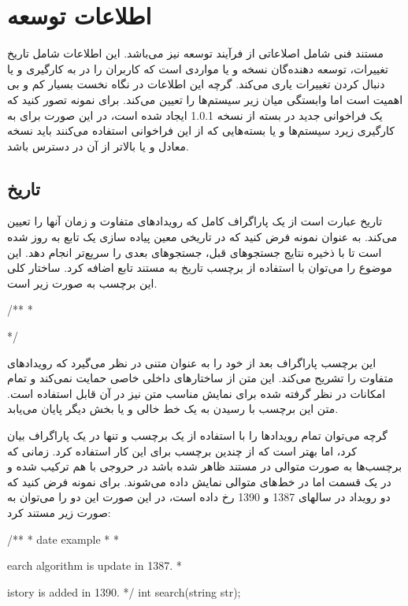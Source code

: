 
\section{اطلاعات توسعه}

مستند فنی شامل اصلاعاتی از فرآیند توسعه نیز می‌باشد. این اطلاعات شامل تاریخ
تغییرات، توسعه دهنده‌گان نسخه و یا مواردی است که کاربران را در به کارگیری و یا
دنبال کردن تغییرات یاری می‌کند.
گرچه این اطلاعات در نگاه نخست بسیار کم و بی اهمیت است اما وابستگی میان زیر
سیستم‌ها را تعیین می‌کند.
برای نمونه تصور کنید که یک فراخوانی جدید در بسته از نسخه 1.0.1 ایجاد شده است، در
این صورت برای به کارگیری زیرد سیستم‌ها و یا بسته‌هایی که از این فراخوانی استفاده
می‌کنند باید نسخه معادل و یا بالاتر از آن در دسترس باشد.

\subsection{تاریخ}

تاریخ عبارت است از یک پاراگراف کامل که رویدادهای متفاوت و زمان آنها را تعیین
می‌کند.
به عنوان نمونه فرض کنید که در تاریخی معین پیاده سازی یک تابع به روز شده است تا
با ذخیره نتایج جستجوهای قبل، جستجوهای بعدی را سریع‌تر انجام دهد.
این موضوع را می‌توان با استفاده از برچسب تاریخ به مستند تابع اضافه کرد.
ساختار کلی این برچسب به صورت زیر است.

\begin{C++}
/**
 * \date {date description}
 */
\end{C++}

این برچسب پاراگراف بعد از خود را به عنوان متنی در نظر می‌گیرد که رویدادهای
متفاوت را تشریح می‌کند.
این متن از ساختارهای داخلی خاصی حمایت نمی‌کند و تمام امکانات در نظر گرفته شده
برای نمایش مناسب متن نیز در آن قابل استفاده است.
متن این برچسب با رسیدن به یک خط خالی و یا بخش دیگر پایان می‌یابد.

گرچه می‌توان تمام رویدادها را با استفاده از یک برچسب و تنها در یک پاراگراف بیان
کرد، اما بهتر است که از چندین برچسب برای این کار استفاده کرد.
زمانی که برچسب‌ها به صورت متوالی در مستند ظاهر شده باشد در حروجی با هم ترکیب شده
و در یک قسمت اما در خط‌های متوالی نمایش داده می‌شوند.
برای نمونه فرض کنید که دو رویداد در سالهای 1387 و 1390 رخ داده است، در این صورت
این دو را می‌توان به صورت زیر مستند کرد:

\begin{C++}
/**
 * \brief date example
 *
 * \date Search algorithm is update in 1387.
 * \date History is added in 1390.
 */
int search(string str);
\end{C++}

